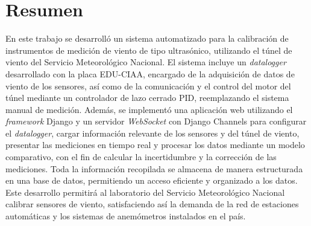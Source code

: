 \chapter*{Resumen}
En este trabajo se desarrolló un sistema automatizado para la calibración de instrumentos de medición de viento de tipo ultrasónico, utilizando el túnel de viento del Servicio Meteorológico Nacional. El sistema incluye un \textit{datalogger} desarrollado con la placa EDU-CIAA, encargado de la adquisición de datos de viento de los sensores, así como de la comunicación y el control del motor del túnel mediante un controlador de lazo cerrado PID, reemplazando el sistema manual de medición. Además, se implementó una aplicación web utilizando el \textit{framework} Django y un servidor \textit{WebSocket} con Django Channels para configurar el \textit{datalogger}, cargar información relevante de los sensores y del túnel de viento, presentar las mediciones en tiempo real y procesar los datos mediante un modelo comparativo, con el fin de calcular la incertidumbre y la corrección de las mediciones. Toda la información recopilada se almacena de manera estructurada en una base de datos, permitiendo un acceso eficiente y organizado a los datos. Este desarrollo permitirá al laboratorio del Servicio Meteorológico Nacional calibrar sensores de viento, satisfaciendo así la demanda de la red de estaciones automáticas y los sistemas de anemómetros instalados en el país.


